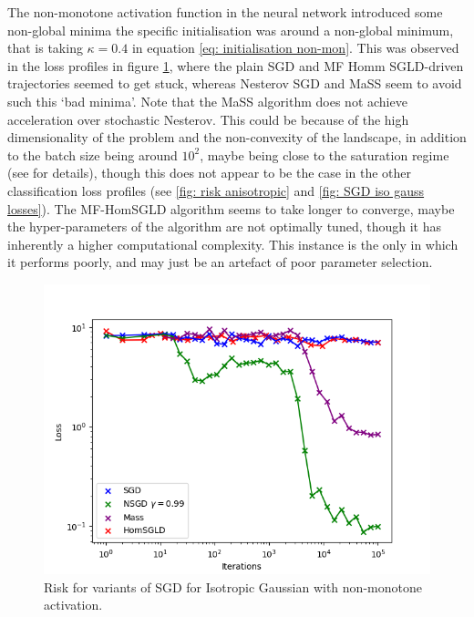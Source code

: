 \documentclass{article}
\theoremstyle{mystyle}
\begin{document}
The non-monotone activation function in the neural network introduced some non-global minima the specific initialisation was around a non-global minimum, that is taking $ \kappa = 0.4$ in equation \ref{eq: initialisation non-mon}. This was observed in the loss profiles in figure \ref{fig: sgd risk iso gauss non-monotone}, where the plain SGD and MF Homm SGLD-driven trajectories seemed to get stuck, whereas Nesterov SGD and MaSS seem to avoid such this ‘bad minima’. Note that the MaSS algorithm does not achieve acceleration over stochastic Nesterov. This could be because of the high dimensionality of the problem and the non-convexity of the landscape, in addition to the batch size being around $ 10^2$, maybe being close to the saturation regime (see \cite{liu2019acceleratingsgdmomentumoverparameterized} for details), though this does not appear to be the case in the other classification loss profiles (see \ref{fig: risk anisotropic} and \ref{fig: SGD iso gauss losses}). The  MF-HomSGLD algorithm seems to take longer to converge, maybe the hyper-parameters of the algorithm are not optimally tuned, though it has inherently a higher computational complexity. This instance is the only in which it performs poorly, and may just be an artefact of poor parameter selection. 


\begin{figure}[H]
    \centering
    \includegraphics[width=0.6\linewidth]{images/Nguyen2018-SGD-algos-risk-iso-gauss-non-mon.png}
    \caption{Risk for variants of SGD for Isotropic Gaussian with non-monotone activation.}
    \label{fig: sgd risk iso gauss non-monotone}
\end{figure}
\end{document}
